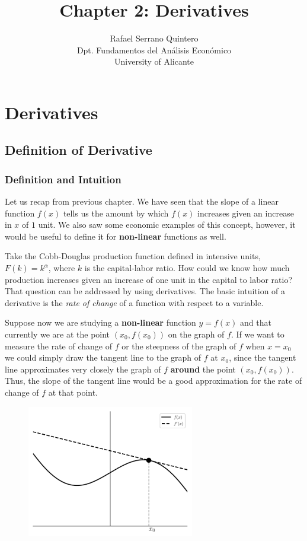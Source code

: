\documentclass[a4paper,11pt]{article}
\title{Chapter 2: Derivatives}
\author{Rafael Serrano Quintero \\
Dpt. Fundamentos del An\'alisis Econ\'omico \\
University of Alicante}
\date{}
\theoremstyle{definition}
\theoremstyle{plain}
\begin{document}
      

\maketitle

\section{Derivatives}\label{derivatives}

\subsection{Definition of Derivative}\label{definition-of-derivative}

\subsubsection{Definition and Intuition}\label{definition-and-intuition}

Let us recap from previous chapter. We have seen that the slope of a
linear function \(f(x)\) tells us the amount by which \(f(x)\) increases
given an increase in \(x\) of \(1\) unit. We also saw some economic
examples of this concept, however, it would be useful to define it for
\textbf{non-linear} functions as well.

Take the Cobb-Douglas production function defined in intensive units,
\(F(k) = k^{\alpha}\), where \(k\) is the capital-labor ratio. How could
we know how much production increases given an increase of one unit in
the capital to labor ratio? That question can be addressed by using
derivatives. The basic intuition of a derivative is the \emph{rate of
change} of a function with respect to a variable.

Suppose now we are studying a \textbf{non-linear} function \(y = f(x)\)
and that currently we are at the point \(\left(x_0, f(x_0)\right)\) on
the graph of \(f\). If we want to measure the rate of change of \(f\) or
the steepness of the graph of \(f\) when \(x = x_0\) we could simply
draw the tangent line to the graph of \(f\) at \(x_0\), since the
tangent line approximates very closely the graph of \(f\)
\textbf{around} the point \(\left(x_0, f(x_0)\right)\). Thus, the slope
of the tangent line would be a good approximation for the rate of change
of \(f\) at that point.

    \begin{figure}[htbp]
    	\centering 
    		\includegraphics[width = 0.65\textwidth]{Ch2_files/Ch2_1_0.pdf}
    \end{figure}
    
\end{document}
